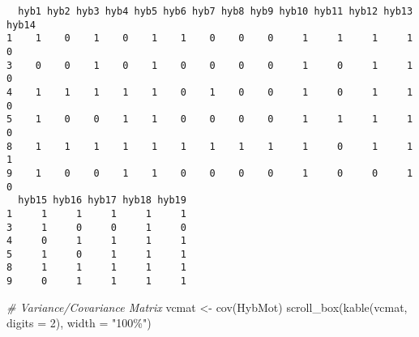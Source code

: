 \documentclass[
]{book}
\newenvironment{Shaded}{\begin{snugshade}}{\end{snugshade}}
\newcommand{\AttributeTok}[1]{\textcolor[rgb]{0.77,0.63,0.00}{#1}}
\newcommand{\CommentTok}[1]{\textcolor[rgb]{0.56,0.35,0.01}{\textit{#1}}}
\newcommand{\DecValTok}[1]{\textcolor[rgb]{0.00,0.00,0.81}{#1}}
\newcommand{\FunctionTok}[1]{\textcolor[rgb]{0.00,0.00,0.00}{#1}}
\newcommand{\NormalTok}[1]{#1}
\newcommand{\OtherTok}[1]{\textcolor[rgb]{0.56,0.35,0.01}{#1}}
\newcommand{\StringTok}[1]{\textcolor[rgb]{0.31,0.60,0.02}{#1}}
\begin{document}
\begin{verbatim}
  hyb1 hyb2 hyb3 hyb4 hyb5 hyb6 hyb7 hyb8 hyb9 hyb10 hyb11 hyb12 hyb13 hyb14
1    1    0    1    0    1    1    0    0    0     1     1     1     1     0
3    0    0    1    0    1    0    0    0    0     1     0     1     1     0
4    1    1    1    1    1    0    1    0    0     1     0     1     1     0
5    1    0    0    1    1    0    0    0    0     1     1     1     1     0
8    1    1    1    1    1    1    1    1    1     1     0     1     1     1
9    1    0    0    1    1    0    0    0    0     1     0     0     1     0
  hyb15 hyb16 hyb17 hyb18 hyb19
1     1     1     1     1     1
3     1     0     0     1     0
4     0     1     1     1     1
5     1     0     1     1     1
8     1     1     1     1     1
9     0     1     1     1     1
\end{verbatim}

\begin{Shaded}
\begin{Highlighting}[]
\CommentTok{\# Variance/Covariance Matrix}
\NormalTok{vcmat }\OtherTok{\textless{}{-}} \FunctionTok{cov}\NormalTok{(HybMot)}
\FunctionTok{scroll\_box}\NormalTok{(}\FunctionTok{kable}\NormalTok{(vcmat, }\AttributeTok{digits =} \DecValTok{2}\NormalTok{), }\AttributeTok{width =} \StringTok{"100\%"}\NormalTok{)}
\end{Highlighting}
\end{Shaded}
\end{document}
